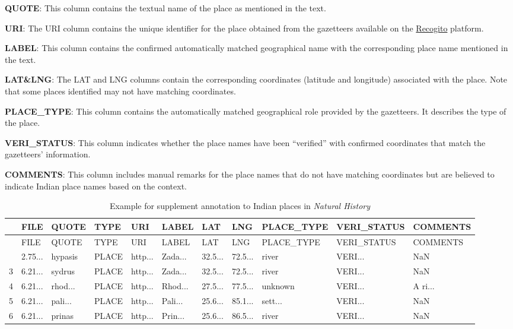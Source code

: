 \documentclass[
  12pt,
]{article}
\begin{document}
\textbf{QUOTE}: This column contains the textual name of the place as
mentioned in the text.

\textbf{URI}: The URI column contains the unique identifier for the
place obtained from the gazetteers available on the
\href{https://recogito.pelagios.org/}{Recogito} platform.

\textbf{LABEL}: This column contains the confirmed automatically matched
geographical name with the corresponding place name mentioned in the
text.

\textbf{LAT\&LNG}: The LAT and LNG columns contain the corresponding
coordinates (latitude and longitude) associated with the place. Note
that some places identified may not have matching coordinates.

\textbf{PLACE\_TYPE}: This column contains the automatically matched
geographical role provided by the gazetteers. It describes the type of
the place.

\textbf{VERI\_STATUS}: This column indicates whether the place names
have been ``verified'' with confirmed coordinates that match the
gazetteers' information.

\textbf{COMMENTS}: This column includes manual remarks for the place
names that do not have matching coordinates but are believed to indicate
Indian place names based on the context.

\hypertarget{tbl-supplement_annotation}{}
\begin{longtable}[]{@{}lllllllllll@{}}
\caption{\label{tbl-supplement_annotation}Example for supplement
annotation to Indian places in \emph{Natural History}}\tabularnewline
\toprule\noalign{}
& FILE & QUOTE & TYPE & URI & LABEL & LAT & LNG & PLACE\_TYPE &
VERI\_STATUS & COMMENTS \\
\midrule\noalign{}
\endfirsthead
\toprule\noalign{}
& FILE & QUOTE & TYPE & URI & LABEL & LAT & LNG & PLACE\_TYPE &
VERI\_STATUS & COMMENTS \\
\midrule\noalign{}
\endhead
\bottomrule\noalign{}
\endlastfoot
0 & 2.75... & hypasis & PLACE & http... & Zada... & 32.5... & 72.5... &
river & VERI... & NaN \\
3 & 6.21... & sydrus & PLACE & http... & Zada... & 32.5... & 72.5... &
river & VERI... & NaN \\
4 & 6.21... & rhod... & PLACE & http... & Rhod... & 27.5... & 77.5... &
unknown & VERI... & A ri... \\
5 & 6.21... & pali... & PLACE & http... & Pali... & 25.6... & 85.1... &
sett... & VERI... & NaN \\
6 & 6.21... & prinas & PLACE & http... & Prin... & 25.6... & 86.5... &
river & VERI... & NaN \\
\end{longtable}
\end{document}
